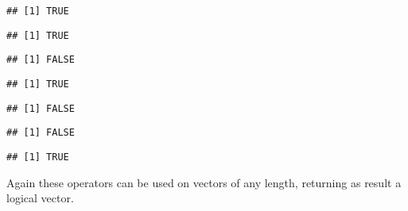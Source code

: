 \documentclass[paper=a4,10pt,div=17,headsepline,BCOR=12mm,twoside,open=right]{scrbook}\usepackage{knitr}
\begin{document}
\begin{knitrout}\footnotesize
{}\color{fgcolor}\begin{kframe}
\begin{alltt}
 \hlopt{>} 
\end{alltt}
\begin{verbatim}
## [1] TRUE
\end{verbatim}
\begin{alltt}
 \hlopt{>=} 
\end{alltt}
\begin{verbatim}
## [1] TRUE
\end{verbatim}
\begin{alltt}
 \hlopt{==}  
\end{alltt}
\begin{verbatim}
## [1] FALSE
\end{verbatim}
\begin{alltt}
 \hlopt{!=} 
\end{alltt}
\begin{verbatim}
## [1] TRUE
\end{verbatim}
\begin{alltt}
 \hlopt{<=} 
\end{alltt}
\begin{verbatim}
## [1] FALSE
\end{verbatim}
\begin{alltt}
 \hlopt{<} 
\end{alltt}
\begin{verbatim}
## [1] FALSE
\end{verbatim}
\begin{alltt}
 \hlkwb{<-} 
 \hlopt{<}  \hlopt{&&}  \hlopt{>} 
\end{alltt}
\begin{verbatim}
## [1] TRUE
\end{verbatim}
\end{kframe}
\end{knitrout}

Again these operators can be used on vectors of any length, returning as result a logical vector.
\end{document}
